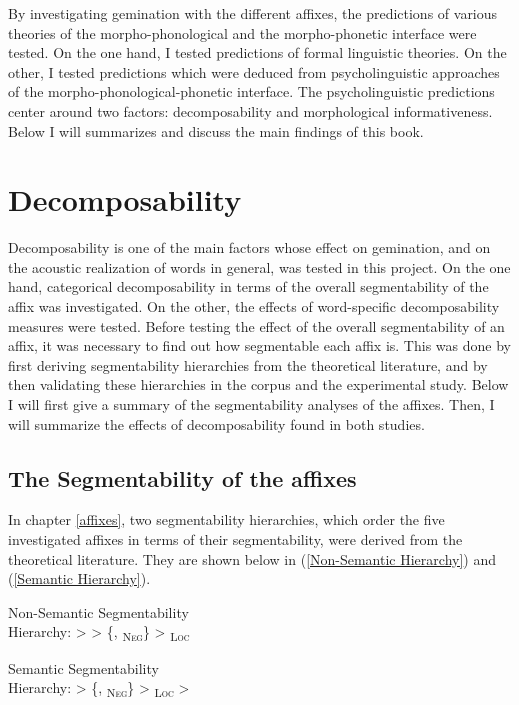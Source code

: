 By investigating gemination with the different affixes, the predictions of various theories of the morpho-phonological and the morpho-phonetic interface were tested. On the one hand, I tested predictions of formal linguistic theories. On the other, I tested predictions which were deduced from psycholinguistic approaches of the morpho-phonological-phonetic interface. The psycholinguistic predictions center around two factors: decomposability and morphological informativeness.  Below I will summarizes and discuss the main findings of this book.



\section{Decomposability}

Decomposability is one of the main factors whose effect on gemination, and on the acoustic realization of words in general, was tested in this project. On the one hand, categorical decomposability in terms of the overall segmentability of the affix was investigated. On the other, the effects of word-specific decomposability measures were tested. 
Before testing the effect of the overall segmentability of an affix, it was necessary to find out how segmentable each affix is. This was done by first deriving segmentability hierarchies from the theoretical literature, and by then validating these hierarchies  in the corpus and the experimental study. Below I will first give a summary of the segmentability analyses of the affixes. Then, I will summarize the effects of decomposability found in both studies.



\subsection{The Segmentability of the affixes}

In chapter \ref{affixes}, two segmentability hierarchies, which order the five investigated affixes in terms of their segmentability, were derived from the theoretical literature. They are shown below in (\ref{Non-Semantic Hierarchy})  and (\ref{Semantic Hierarchy}). 


	\begin{exe}
		\ex \label{Non-Semantic Hierarchy} {Non-Semantic Segmentability }\\
		Hierarchy:\hspace*{3.5cm}   >  > \{, \textsubscript{\textsc{Neg}}\} >  \textsubscript{\textsc{Loc}}
		
				\ex \label{Semantic Hierarchy} 	{Semantic Segmentability }\\
				Hierarchy: \hspace*{3.5cm}  > \{, \textsubscript{\textsc{Neg}}\} >  \textsubscript{\textsc{Loc}} > 
	\end{exe}

